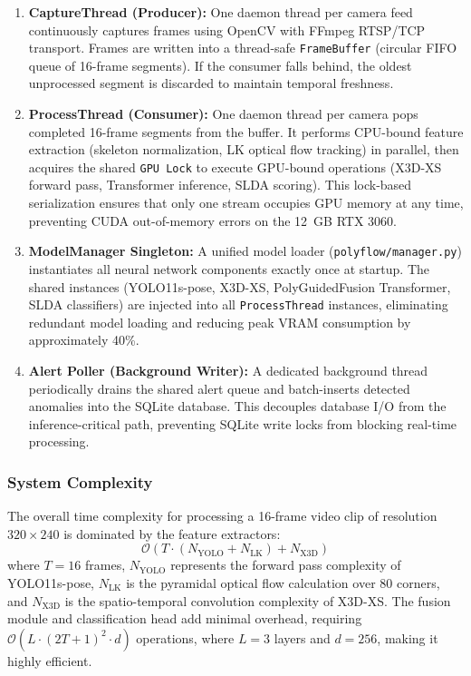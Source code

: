 \documentclass[12pt]{article}
\begin{document}
\begin{enumerate}
    \item \textbf{CaptureThread (Producer):} One daemon thread per camera feed continuously captures frames using OpenCV with FFmpeg RTSP/TCP transport. Frames are written into a thread-safe \texttt{FrameBuffer} (circular FIFO queue of 16-frame segments). If the consumer falls behind, the oldest unprocessed segment is discarded to maintain temporal freshness.
    
    \item \textbf{ProcessThread (Consumer):} One daemon thread per camera pops completed 16-frame segments from the buffer. It performs CPU-bound feature extraction (skeleton normalization, LK optical flow tracking) in parallel, then acquires the shared \texttt{GPU Lock} to execute GPU-bound operations (X3D-XS forward pass, Transformer inference, SLDA scoring). This lock-based serialization ensures that only one stream occupies GPU memory at any time, preventing CUDA out-of-memory errors on the 12~GB RTX 3060.
    
    \item \textbf{ModelManager Singleton:} A unified model loader (\texttt{polyflow/manager.py}) instantiates all neural network components exactly once at startup. The shared instances (YOLO11s-pose, X3D-XS, PolyGuidedFusion Transformer, SLDA classifiers) are injected into all \texttt{ProcessThread} instances, eliminating redundant model loading and reducing peak VRAM consumption by approximately 40\%.
    
    \item \textbf{Alert Poller (Background Writer):} A dedicated background thread periodically drains the shared alert queue and batch-inserts detected anomalies into the SQLite database. This decouples database I/O from the inference-critical path, preventing SQLite write locks from blocking real-time processing.
\end{enumerate}

\subsubsection{System Complexity}
The overall time complexity for processing a 16-frame video clip of resolution $320 \times 240$ is dominated by the feature extractors:
\[
\mathcal{O}\left(T \cdot (N_{\text{YOLO}} + N_{\text{LK}}) + N_{\text{X3D}}\right)
\]
where $T=16$ frames, $N_{\text{YOLO}}$ represents the forward pass complexity of YOLO11s-pose, $N_{\text{LK}}$ is the pyramidal optical flow calculation over 80 corners, and $N_{\text{X3D}}$ is the spatio-temporal convolution complexity of X3D-XS. The fusion module and classification head add minimal overhead, requiring $\mathcal{O}(L \cdot (2T+1)^2 \cdot d)$ operations, where $L=3$ layers and $d=256$, making it highly efficient.
\end{document}
